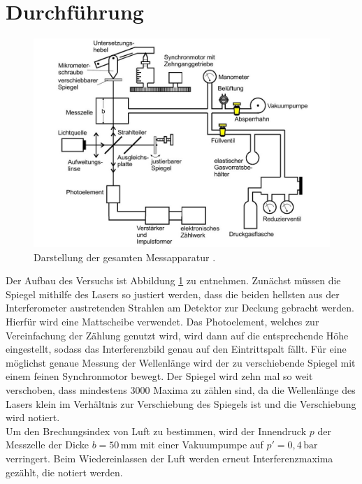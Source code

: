 \section{Durchführung}
\label{sec:Durchführung}
\begin{figure}[H]
  \centering
  \includegraphics[scale=0.8]{aparatur.jpg}
  \caption{Darstellung der gesamten Messapparatur \cite{Anleitung}.}
  \label{fig:aparatur}
\end{figure}
Der Aufbau des Versuchs ist Abbildung \ref{fig:aparatur} zu entnehmen. Zunächst müssen die Spiegel mithilfe des Lasers so justiert werden,
dass die beiden hellsten aus der Interferometer austretenden Strahlen am Detektor zur Deckung gebracht werden. Hierfür
wird eine Mattscheibe verwendet. Das Photoelement, welches zur Vereinfachung der Zählung genutzt wird, 
wird dann auf die entsprechende Höhe eingestellt, sodass das Interferenzbild genau auf den Eintrittspalt
fällt. Für eine möglichst genaue Messung der Wellenlänge wird der zu verschiebende Spiegel mit einem feinen Synchronmotor bewegt.
Der Spiegel wird zehn mal so weit verschoben, dass mindestens 3000 Maxima zu zählen sind, da die Wellenlänge des Lasers
klein im Verhältnis zur Verschiebung des Spiegels ist und die Verschiebung wird notiert. \\
Um den Brechungsindex von Luft zu bestimmen, wird der Innendruck $p$ der Messzelle der Dicke $b = 50\,\si{\milli\meter}$ mit einer
Vakuumpumpe auf $p' = 0,4\,\si{\bar}$ verringert. Beim Wiedereinlassen der Luft werden erneut Interferenzmaxima gezählt, die notiert werden.